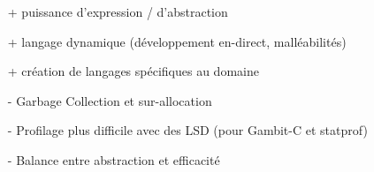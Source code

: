 \documentclass[12pt,oneside,letterpaper,francais]{book}
\newcommand{\codeinput}[1]{\begin{singlespace}\end{singlespace}}
\begin{document}
\begin{itemize}
  \item[+] puissance d'expression / d'abstraction
  \item[+] langage dynamique (développement en-direct, malléabilités)
  \item[+] création de langages spécifiques au domaine

  \item[-] Garbage Collection et sur-allocation
  \item[-] Profilage plus difficile avec des LSD (pour Gambit-C et statprof)
  \item[-] Balance entre abstraction et efficacité
\end{itemize}





\appendix






\end{document}
